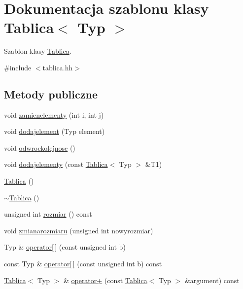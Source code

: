 \hypertarget{class_tablica}{\section{Dokumentacja szablonu klasy Tablica$<$ Typ $>$}
\label{class_tablica}
}


Szablon klasy \hyperlink{class_tablica}{Tablica}.  




{\ttfamily \#include $<$tablica.\-hh$>$}

\subsection*{Metody publiczne}
\begin{DoxyCompactItemize}
\item 
void \hyperlink{class_tablica_aea49337f0b2ee035ddc1df13ff228511}{zamienelementy} (int i, int j)
\item 
void \hyperlink{class_tablica_a630e070c59709cdfe436db9b2f57c81f}{dodajelement} (Typ element)
\item 
void \hyperlink{class_tablica_a405e0d82e9594f27cfc9dac94e53b582}{odwrockolejnosc} ()
\item 
void \hyperlink{class_tablica_ad139387fb64394e133e1e1b3402f7290}{dodajelementy} (const \hyperlink{class_tablica}{Tablica}$<$ Typ $>$ \&T1)
\item 
\hyperlink{class_tablica_a7d54bbcaa7963c50ee57e69f700b6cfc}{Tablica} ()
\item 
\hyperlink{class_tablica_aea2479778376598550fe82ec459a24ba}{$\sim$\-Tablica} ()
\item 
unsigned int \hyperlink{class_tablica_acf3f8d852711619ed205e1569f40f789}{rozmiar} () const 
\item 
void \hyperlink{class_tablica_aafcf1f86b79c0146fa313bae711cc97e}{zmianarozmiaru} (unsigned int nowyrozmiar)
\item 
Typ \& \hyperlink{class_tablica_a87f292495232b4f959291a3bc87bb829}{operator\mbox{[}$\,$\mbox{]}} (const unsigned int b)
\item 
const Typ \& \hyperlink{class_tablica_a5d41b52977f5bc0a3abf9e62cc209cc4}{operator\mbox{[}$\,$\mbox{]}} (const unsigned int b) const 
\item 
\hyperlink{class_tablica}{Tablica}$<$ Typ $>$ \& \hyperlink{class_tablica_ae0716b9a85eb0306d3a722376727be6e}{operator+} (const \hyperlink{class_tablica}{Tablica}$<$ Typ $>$ \&argument) const 
\item 

\end{DoxyCompactItemize}
